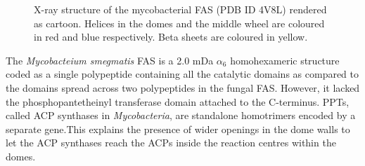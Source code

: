 			\setlength\fboxsep{5pt}
 			\setlength\fboxrule{1.5pt}
			\begin{figure} []
			\centering
			\caption[X-ray structure of the mycobacterial FAS (PDB ID 4V8L) rendered as cartoon.]{X-ray structure of the mycobacterial FAS (PDB ID 4V8L) rendered as cartoon. Helices in the domes and the middle wheel are coloured in red and blue respectively. Beta sheets are coloured in yellow.}
			\label{fig:mycoFasStructure}
			\end{figure}			
					
		The \textit{Mycobacteium smegmatis} FAS is a 2.0 mDa $\alpha_{6}$ homohexameric structure coded as a single polypeptide containing all the catalytic domains as compared to the domains spread across two polypeptides in the fungal FAS. However, it lacked the phosphopantetheinyl transferase domain attached to the C-terminus. PPTs, called ACP synthases in \textit{Mycobacteria}, are standalone homotrimers encoded by a separate gene.This explains the presence of wider openings in the dome walls to let the ACP synthases reach the ACPs inside the reaction centres within the domes. %

